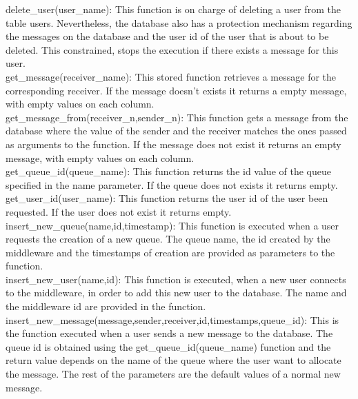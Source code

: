 delete\_user(user\_name): This function is on charge of deleting a user from the table users. Nevertheless, the database also has a protection mechanism regarding the messages on the database and the user id of the user that is about to be deleted. This constrained, stops the execution if there exists a message for this user.\\

get\_message(receiver\_name): This stored function retrieves a message for the corresponding receiver. If the message doesn’t exists it returns a empty message, with empty values on each column.\\

get\_message\_from(receiver\_n,sender\_n): This function gets a message from the database where the value of the sender and the receiver matches the ones passed as arguments to the function. If the message does not exist it returns an empty message, with empty values on each column.\\

get\_queue\_id(queue\_name): This function returns the id value of the queue specified in the name parameter. If the queue does not exists it returns empty.\\

get\_user\_id(user\_name): This function returns the user id of the user been requested. If the user does not exist it returns empty.\\

insert\_new\_queue(name,id,timestamp): This function is executed when a user requests the creation of a new queue. The queue name, the id created by the middleware and the timestamps of creation are provided as parameters to the function.\\

insert\_new\_user(name,id): This function is executed, when a new user connects to the middleware, in order to add this new user to the database. The name and the middleware id are provided in the function.\\

insert\_new\_message(message,sender,receiver,id,timestamps,queue\_id): This is the function executed when a user sends a new message to the database. The queue id is obtained using the get\_queue\_id(queue\_name) function and the return value depends on the name of the queue where the user want to allocate the message. The rest of the parameters are the default values of a normal new message.


